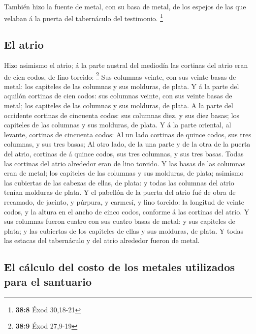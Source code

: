  También hizo la fuente de metal, con su basa de metal, de
los espejos de las que velaban á la puerta del tabernáculo del
testimonio. \footnote{\textbf{38:8} Éxod 30,18-21}

\hypertarget{el-atrio}{%
\subsection{El atrio}\label{el-atrio}}

 Hizo asimismo el atrio; á la parte austral del mediodía las
cortinas del atrio eran de cien codos, de lino torcido: \footnote{\textbf{38:9}
  Éxod 27,9-19}  Sus columnas veinte, con sus veinte basas
de metal: los capiteles de las columnas y sus molduras, de plata.
 Y á la parte del aquilón cortinas de cien codos: sus
columnas veinte, con sus veinte basas de metal; los capiteles de las
columnas y sus molduras, de plata.  A la parte del
occidente cortinas de cincuenta codos: sus columnas diez, y sus diez
basas; los capiteles de las columnas y sus molduras, de plata.
 Y á la parte oriental, al levante, cortinas de cincuenta
codos:  Al un lado cortinas de quince codos, sus tres
columnas, y sus tres basas;  Al otro lado, de la una parte
y de la otra de la puerta del atrio, cortinas de á quince codos, sus
tres columnas, y sus tres basas.  Todas las cortinas del
atrio alrededor eran de lino torcido.  Y las basas de las
columnas eran de metal; los capiteles de las columnas y sus molduras, de
plata; asimismo las cubiertas de las cabezas de ellas, de plata: y todas
las columnas del atrio tenían molduras de plata.  Y el
pabellón de la puerta del atrio fué de obra de recamado, de jacinto, y
púrpura, y carmesí, y lino torcido: la longitud de veinte codos, y la
altura en el ancho de cinco codos, conforme á las cortinas del atrio.
 Y sus columnas fueron cuatro con sus cuatro basas de
metal: y sus capiteles de plata; y las cubiertas de los capiteles de
ellas y sus molduras, de plata.  Y todas las estacas del
tabernáculo y del atrio alrededor fueron de metal.

\hypertarget{el-cuxe1lculo-del-costo-de-los-metales-utilizados-para-el-santuario}{%
\subsection{El cálculo del costo de los metales utilizados para el
santuario}\label{el-cuxe1lculo-del-costo-de-los-metales-utilizados-para-el-santuario}}

